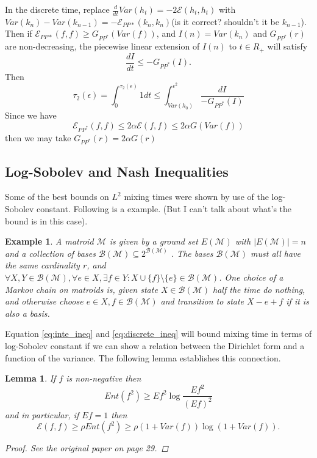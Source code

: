 \documentclass[12pt,reqno]{amsart}
\newtheorem{lem}[thm]{Lemma}
\newtheorem{example}[thm]{Example}
\begin{document}
In the discrete time, replace  $\frac{d}{dt}Var(h_t)=-2\mathcal{E}(h_t,h_t)$ with $Var(k_n)-Var(k_{n-1}) = -\mathcal{E}_{PP*}(k_n,k_n)$(\tiny is it correct? shouldn't it be $k_{n-1}$)\normalsize.
Then if $\mathcal{E}_{PP*}(f,f)\geq G_{PP^*}(Var(f))$, and $I(n)=Var(k_n)$ and $G_{PP^*}(r)$ are non-decreasing, the piecewise linear extension of $I(n)$ to $t\in R_+$ will satisfy
\begin{equation}
  \label{eq:discrete_ineq}
  \frac{dI}{dt}\leq -G_{PP^*}(I).
\end{equation}
Then
\begin{equation}
 \tau_2(\epsilon) = \int_0^{\tau_2(\epsilon)}1dt \leq \int_{Var(h_0)}^{\epsilon^2}\frac{dI}{-G_{PP^*}(I)} 
\end{equation}
Since we have 
$$\mathcal{E}_{PP^*}(f,f)\leq 2\alpha\mathcal{E}(f,f) \leq 2\alpha G(Var(f)) 
$$
then we may take $G_{PP^*}(r)=2\alpha G(r)$

\subsection{Log-Sobolev and Nash Inequalities}
Some of the best bounds on $L^2$ mixing times were shown by use of the log-Sobolev constant. Following is a example. (But I can't talk about what's the bound is in this case).
\begin{example}
  A matroid $\mathcal{M}$ is given by a ground set $E(\mathcal{M})$ with 
$|E(\mathcal{M})|=n$ and a collection of bases $\mathcal{B(M)}\subseteq 2^{\mathcal{B(M)}}$
. The bases $\mathcal{B(M)}$ must all have the same cardinality $r$, and $\forall X,Y\in \mathcal{B(M)}, \forall e\in X, \exists f\in Y : X\cup\{f\}\setminus \{e\}\in \mathcal{B(M)}$. One choice of a Markov chain on matroids is, given state $X\in \mathcal{B(M)}$ half the time do nothing, and otherwise choose $e\in X, f\in \mathcal{B(M)}$ and transition to state $X-e+f$ if it is also a basis.
\end{example}

Equation \eqref{eq:inte_ineq} and \eqref{eq:discrete_ineq} will bound mixing time in terms of log-Sobolev constant if we can show a relation between the Dirichlet form and a function of the variance. The following lemma establishes this connection.

\begin{lem}
  If $f$ is non-negative then
$$
Ent(f^2) \geq Ef^2 \log \frac{Ef^2}{(Ef)^2}
$$
and in particular, if $Ef=1$ then 
$$
\mathcal{E}(f,f) \geq \rho Ent(f^2) \geq \rho (1 + Var(f))\log (1 + Var(f)).
$$

\begin{proof}
  See the original paper on page 29.
\end{proof}
\end{lem}
\end{document}
